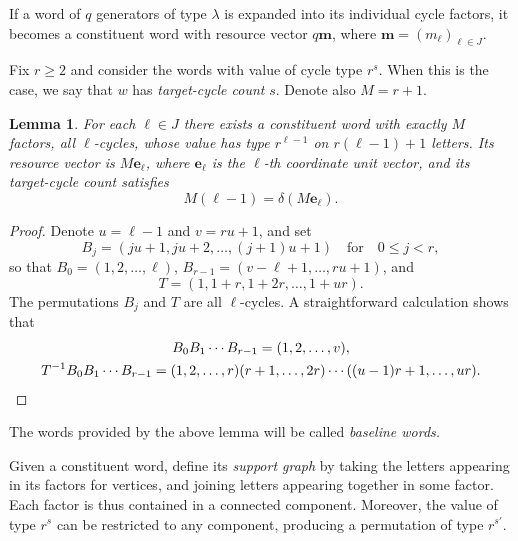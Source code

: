 \documentclass[DIV=12,10pt]{scrartcl}
\newtheorem{lemma}{Lemma}
\theoremstyle{definition}
\newcommand{\mvec}{\mathbf{m}}
\newcommand{\evec}{\mathbf{e}}
\begin{document}
If a word of $q$ generators of type $\lambda$ is expanded into its individual cycle factors, it becomes a constituent word with resource vector $q\mvec$, where $\mvec = (m_\ell)_{\ell\in J}$.

Fix $r\geqslant 2$ and consider the words with value of cycle type $r^s$. When this is the case, we say that $w$ has \emph{target-cycle count} $s$. Denote also $M=r+1$.

\begin{lemma}
	\label{lemma:baseline_word}
	For each $\ell\in J$ there exists a constituent word with exactly $M$ factors, all $\ell$-cycles, whose value has type $r^{\ell-1}$ on $r(\ell-1)+1$ letters. Its resource vector is $M\evec_\ell$, where $\evec_\ell$ is the $\ell$-th coordinate unit vector, and its target-cycle count satisfies
	\begin{equation}
		\label{eq:baseline-word-target-cycle-count}
		M(\ell-1) = \delta(M\evec_\ell).
	\end{equation}
\end{lemma}
\begin{proof}
Denote $u=\ell-1$ and $v=ru+1$, and set
\[
B_j = (ju+1,ju+2,\ldots,(j+1)u+1) \quad \text{for} \quad 0\leqslant j <r,
\]
so that $B_0=(1,2,\ldots,\ell)$, $B_{r-1} = (v-\ell+1,\ldots,ru+1)$, and
\[
T = (1,1+r,1+2r,\ldots,1+ur).
\]
The permutations $B_j$ and $T$ are all $\ell$-cycles. A straightforward calculation shows that
\begin{gather*}
	B_0B_1\cdots B_{r-1} = (1,2,\ldots,v), \\
	T^{-1}B_0B_1\cdots B_{r-1} = (1,2,\ldots,r)(r+1,\ldots,2r)\cdots((u-1)r+1,\ldots,ur). \qedhere
\end{gather*}
\end{proof}
The words provided by the above lemma will be called \emph{baseline words.}

Given a constituent word, define its \emph{support graph} by taking the letters appearing in its factors for vertices, and joining letters appearing together in some factor. Each factor is thus contained in a connected component. Moreover, the value of type $r^s$ can be restricted to any component, producing a permutation of type $r^{s'}$.
\end{document}
